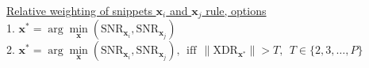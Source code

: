 



{\color{red}
\underline{Relative weighting of snippets $\mathbf{x}_i$ and $\mathbf{x}_j$ rule, options}\\
1. $\mathbf{x}^* = \arg \min\limits_\mathbf{x} (\mathrm{SNR}_{\mathbf{x}_i}, \mathrm{SNR}_{\mathbf{x}_j})$\\
2. $\mathbf{x}^* = \arg \min\limits_\mathbf{x} (\mathrm{SNR}_{\mathbf{x}_i}, \mathrm{SNR}_{\mathbf{x}_j}), \ \ \mathrm{iff} \ \ \|\mathrm{XDR_{\mathbf{x}^*}} \| > T, \ \ T \in \{2, 3, \ldots, P\}$
}










 
